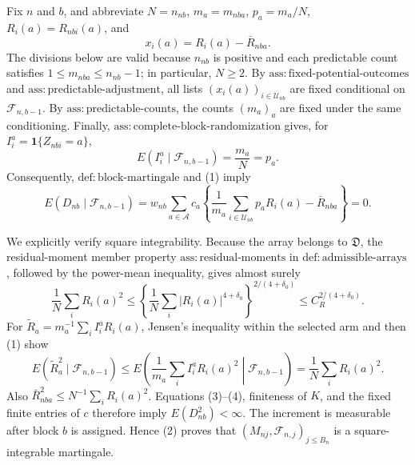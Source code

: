 Fix \(n\) and \(b\), and abbreviate \(N=n_{nb}\), \(m_a=m_{nba}\), \(p_a=m_a/N\), \(R_i(a)=R_{nbi}(a)\), and
\[
x_i(a)=R_i(a)-\bar R_{nba}.
\]
The divisions below are valid because \(n_{nb}\) is positive and each predictable count satisfies \(1\le m_{nba}\le n_{nb}-1\); in particular, \(N\ge2\). By \(\mathrm{ass:fixed\text{-}potential\text{-}outcomes}\) and \(\mathrm{ass:predictable\text{-}adjustment}\), all lists \((x_i(a))_{i\in\mathcal U_{nb}}\) are fixed conditional on \(\mathcal F_{n,b-1}\). By \(\mathrm{ass:predictable\text{-}counts}\), the counts \((m_a)_a\) are fixed under the same conditioning. Finally, \(\mathrm{ass:complete\text{-}block\text{-}randomization}\) gives, for \(I_i^a=\mathbf 1\{Z_{nbi}=a\}\),
\[
E(I_i^a\mid\mathcal F_{n,b-1})=\frac{m_a}{N}=p_a.
\tag{1}
\]
Consequently, \(\mathrm{def:block\text{-}martingale}\) and (1) imply
\[
E(D_{nb}\mid\mathcal F_{n,b-1})
=w_{nb}\sum_{a\in\mathcal A}c_a
\left\{\frac1{m_a}\sum_{i\in\mathcal U_{nb}}p_aR_i(a)-\bar R_{nba}\right\}=0.
\tag{2}
\]

We explicitly verify square integrability. Because the array belongs to \(\mathfrak D\), the residual-moment member property \(\mathrm{ass:residual\text{-}moments}\) in \(\mathrm{def:admissible\text{-}arrays}\), followed by the power-mean inequality, gives almost surely
\[
\frac1N\sum_iR_i(a)^2
\le\left\{\frac1N\sum_i|R_i(a)|^{4+\delta_0}\right\}^{2/(4+\delta_0)}
\le C_R^{2/(4+\delta_0)}.
\tag{3}
\]
For \(\widetilde R_a=m_a^{-1}\sum_iI_i^aR_i(a)\), Jensen's inequality within the selected arm and then (1) show
\[
E(\widetilde R_a^2\mid\mathcal F_{n,b-1})
\le E\left(\frac1{m_a}\sum_iI_i^aR_i(a)^2\middle|\mathcal F_{n,b-1}\right)
=\frac1N\sum_iR_i(a)^2.
\tag{4}
\]
Also \(\bar R_{nba}^2\le N^{-1}\sum_iR_i(a)^2\). Equations (3)--(4), finiteness of \(K\), and the fixed finite entries of \(c\) therefore imply \(E(D_{nb}^2)<\infty\). The increment is measurable after block \(b\) is assigned. Hence (2) proves that \((M_{nj},\mathcal F_{n,j})_{j\le B_n}\) is a square-integrable martingale.

